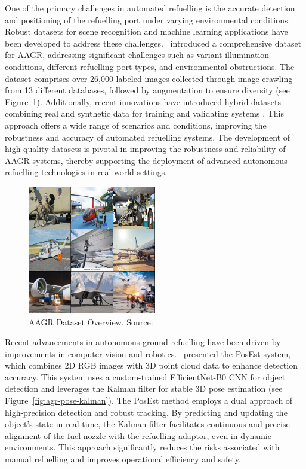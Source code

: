 \documentclass[12pt,oneside]{book} %
\begin{document}
One of the primary challenges in automated refuelling is the accurate detection
and positioning of the refuelling port under varying environmental conditions.
Robust datasets for scene recognition and machine learning applications have
been developed to address these challenges.~\citet{DatasetAGR} introduced a
comprehensive dataset for AAGR, addressing significant challenges such as
variant illumination conditions, different refuelling port types, and
environmental obstructions. The dataset comprises over 26,000 labeled images
collected through image crawling from 13 different databases, followed by
augmentation to ensure diversity (see Figure~\ref{fig:agr-dataset}).
Additionally, recent innovations have introduced hybrid datasets combining real
and synthetic data for training and validating systems
\cite{HybridDatasetAGRV1}. This approach offers a wide range of scenarios and
conditions, improving the robustness and accuracy of automated refuelling
systems. The development of high-quality datasets is pivotal in improving the
robustness and reliability of AAGR systems, thereby supporting the deployment
of advanced autonomous refuelling technologies in real-world settings.

\begin{figure}[H]
    \centering
    \includegraphics[width=0.5\textwidth]{figures/AGRDatasetGrid.png}
    \caption{AAGR Dataset Overview. Source: \citet{DatasetAGR}}\label{fig:agr-dataset}
\end{figure}

\newpage
Recent advancements in autonomous ground refuelling have been driven by
improvements in computer vision and robotics.~\citet{AGRPoseEstimation}
presented the PosEst system, which combines 2D RGB images with 3D point cloud
data to enhance detection accuracy. This system uses a custom-trained
EfficientNet-B0 CNN for object detection and leverages the Kalman filter for
stable 3D pose estimation (see Figure~\ref{fig:agr-pose-kalman}). The PosEst
method employs a dual approach of high-precision detection and robust tracking.
By predicting and updating the object’s state in real-time, the Kalman filter
facilitates continuous and precise alignment of the fuel nozzle with the
refuelling adaptor, even in dynamic environments. This approach significantly
reduces the risks associated with manual refuelling and improves operational
efficiency and safety.
\end{document}
